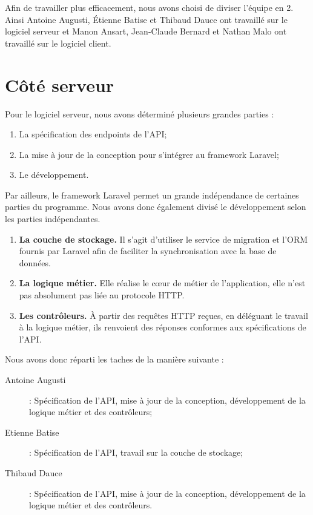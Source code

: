 Afin de travailler plus efficacement, nous avons choisi de diviser l'équipe en 2. Ainsi Antoine Augusti, Étienne Batise et Thibaud Dauce ont travaillé sur le logiciel serveur et Manon Ansart, Jean-Claude Bernard et Nathan Malo ont travaillé sur le logiciel client.\newline

\section{Côté serveur}
    Pour le logiciel serveur, nous avons déterminé plusieurs grandes parties :
	\begin{enumerate}
		\item La spécification des endpoints de l'API;
		\item La mise à jour de la conception pour s'intégrer au framework Laravel;
		\item Le développement.\newline
	\end{enumerate}

    Par ailleurs, le framework Laravel permet un grande indépendance de certaines parties du programme. Nous avons donc également divisé le développement selon les parties indépendantes.
	\begin{enumerate}
		\item \textbf{La couche de stockage.} Il s'agit d'utiliser le service de migration et l'ORM fournis par Laravel afin de faciliter la synchronisation avec la base de données.
		\item \textbf{La logique métier.} Elle réalise le cœur de métier de l'application, elle n'est pas absolument pas liée au protocole HTTP.
		\item \textbf{Les contrôleurs.} À partir des requêtes HTTP reçues, en déléguant le travail à la logique métier, ils renvoient des réponses conformes aux spécifications de l'API.
	\end{enumerate}\bigskip

    Nous avons donc réparti les taches de la manière suivante :
	\begin{description}
        \item [Antoine Augusti] : Spécification de l'API, mise à jour de la conception, développement de la logique métier et des contrôleurs;
		\item [Etienne Batise] : Spécification de l'API, travail sur la couche de stockage;
		\item [Thibaud Dauce] : Spécification de l'API, mise à jour de la conception, développement de la logique métier et des contrôleurs.
	\end{description}


